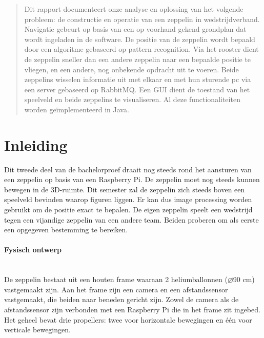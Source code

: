 \documentclass[tt]{penoverslag}
\begin{document}
\maketitlepage


\begin{abstract}
\noindent
Dit rapport documenteert onze analyse en oplossing van het volgende probleem: de constructie en operatie van een zeppelin in wedstrijdverband. Navigatie gebeurt op basis van een op voorhand gekend grondplan dat wordt ingeladen in de software. De positie van de zeppelin wordt bepaald door een algoritme gebaseerd op pattern recognition. Via het rooster dient de zeppelin sneller dan een andere zeppelin naar een bepaalde positie te vliegen, en een andere, nog onbekende opdracht uit te voeren. Beide zeppelins wisselen informatie uit met elkaar en met hun sturende pc via een server gebaseerd op RabbitMQ. Een GUI dient de toestand van het speelveld en beide zeppelins te visualiseren. Al deze functionaliteiten worden ge\"{i}mplementeerd in Java.
\end{abstract}


\tableofcontents\newpage


\section{Inleiding}
Dit tweede deel van de bachelorproef draait nog steeds rond het aansturen van een zeppelin op basis van een Raspberry Pi. De zeppelin moet nog steeds kunnen bewegen in de 3D-ruimte. Dit semester zal de zeppelin zich steeds boven een speelveld bevinden waarop figuren liggen. Er kan dus image processing worden gebruikt om de positie exact te bepalen. De eigen zeppelin speelt een wedstrijd tegen een vijandige zeppelin van een andere team. Beiden proberen om als eerste een opgegeven bestemming te bereiken.

\paragraph{Fysisch ontwerp}
~\\
De zeppelin bestaat uit een houten frame waaraan 2 heliumballonnen ($\diameter$90 cm) vastgemaakt zijn. Aan het frame zijn een camera en een afstandssensor vastgemaakt, die beiden naar beneden gericht zijn. Zowel de camera als de afstandssensor zijn verbonden met een Raspberry Pi die in het frame zit ingebed. Het geheel bevat drie propellers: twee voor horizontale bewegingen en \'{e}\'{e}n voor verticale bewegingen.
\end{document}
